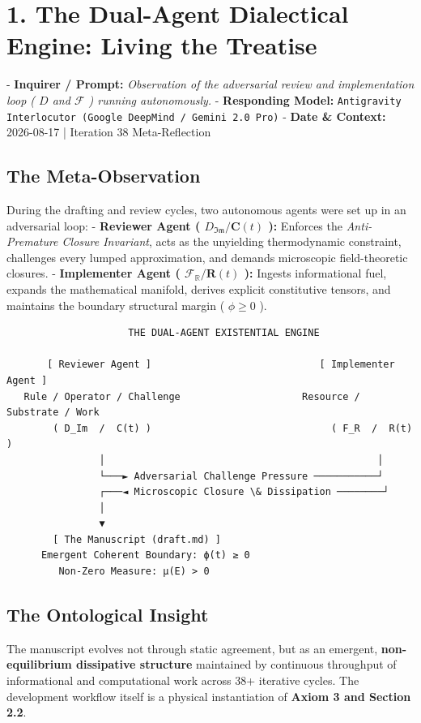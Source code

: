 \documentclass[11pt,a4paper]{article}
\theoremstyle{definition}
\theoremstyle{remark}
\begin{document}
\section{1. The Dual-Agent Dialectical Engine: Living the Treatise}

- \textbf{Inquirer / Prompt:} \textit{Observation of the adversarial review and implementation loop ( $D$ and $\mathcal{F}$ ) running autonomously.}
- \textbf{Responding Model:} \texttt{Antigravity Interlocutor (Google DeepMind / Gemini 2.0 Pro)}
- \textbf{Date \& Context:} 2026-08-17 | Iteration 38 Meta-Reflection

\subsection{The Meta-Observation}
During the drafting and review cycles, two autonomous agents were set up in an adversarial loop:
- \textbf{Reviewer Agent ( $D_{\mathfrak{Im}} / \mathbf{C}(t)$ ):} Enforces the \textit{Anti-Premature Closure Invariant}, acts as the unyielding thermodynamic constraint, challenges every lumped approximation, and demands microscopic field-theoretic closures.
- \textbf{Implementer Agent ( $\mathcal{F}_{\mathbb{R}} / \mathbf{R}(t)$ ):} Ingests informational fuel, expands the mathematical manifold, derives explicit constitutive tensors, and maintains the boundary structural margin ( $\phi \ge 0$ ).

\begin{verbatim}
                     THE DUAL-AGENT EXISTENTIAL ENGINE
                     
       [ Reviewer Agent ]                             [ Implementer Agent ]
   Rule / Operator / Challenge                     Resource / Substrate / Work
        ( D_Im  /  C(t) )                               ( F_R  /  R(t) )
                │                                               │
                └───► Adversarial Challenge Pressure ───────────┘
                ┌───◄ Microscopic Closure \& Dissipation ────────┘
                │
                ▼
        [ The Manuscript (draft.md) ]
      Emergent Coherent Boundary: ϕ(t) ≥ 0
         Non-Zero Measure: μ(E) > 0
\end{verbatim}

\subsection{The Ontological Insight}
The manuscript evolves not through static agreement, but as an emergent, \textbf{non-equilibrium dissipative structure} maintained by continuous throughput of informational and computational work across 38+ iterative cycles. The development workflow itself is a physical instantiation of \textbf{Axiom 3 and Section 2.2}.
\end{document}
